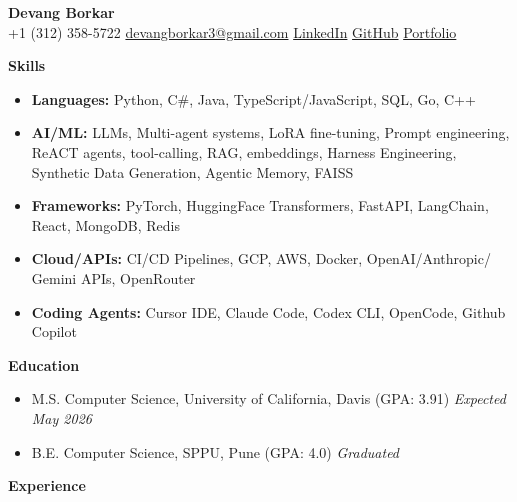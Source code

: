 \documentclass[11pt]{article}
\newcommand{\customspacing}{\setstretch{1.05}}
\begin{document}
\begin{center}
{\fontsize{15}{17}\selectfont \textbf{Devang Borkar}}\\
\vspace{2pt}
+1 (312) 358-5722 \quad\textbar\quad \href{mailto:devangborkar3@gmail.com}{devangborkar3@gmail.com}
\quad\textbar\quad \href{https://www.linkedin.com/in/devang-borkar-710b49201/}{LinkedIn}
\quad\textbar\quad \href{https://github.com/devangb3}{GitHub}
\quad\textbar\quad \href{https://devang-borkar.netlify.app/}{Portfolio}
\end{center}

\fontsize{10.5}{12}\selectfont
\customspacing

\noindent\textbf{Skills}
\vspace{-6pt}
\begin{itemize}[leftmargin=0.45in, topsep=2pt, itemsep=-5pt]
\item \textbf{Languages:} Python, C\#, Java, TypeScript/JavaScript, SQL, Go, C++
\item \textbf{AI/ML:} LLMs, Multi-agent systems, LoRA fine-tuning, Prompt engineering, ReACT agents, tool-calling, RAG, embeddings, Harness Engineering, Synthetic Data Generation, Agentic Memory, FAISS
\item \textbf{Frameworks:} PyTorch, HuggingFace Transformers, FastAPI, LangChain, React, MongoDB, Redis
\item \textbf{Cloud/APIs:} CI/CD Pipelines, GCP, AWS, Docker, OpenAI/Anthropic/ Gemini APIs, OpenRouter
\item \textbf{Coding Agents:} Cursor IDE, Claude Code, Codex CLI, OpenCode, Github Copilot
\end{itemize}
\vspace{-6pt}
\noindent\textbf{Education}
\vspace{-6pt}
\begin{itemize}[leftmargin=0.45in, topsep=2pt, itemsep=-5pt]
\item M.S. Computer Science, University of California, Davis (GPA: 3.91) \hfill \textit{Expected May 2026}
\item B.E. Computer Science, SPPU, Pune (GPA: 4.0) \hfill \textit{Graduated}
\end{itemize}
\vspace{-6pt}
\noindent\textbf{Experience}
\vspace{-3pt}
\end{document}
